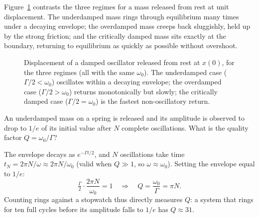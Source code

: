 Figure~\ref{fig:damped-decay} contrasts the three regimes for a mass released from rest at unit displacement. The underdamped mass rings through equilibrium many times under a decaying envelope; the overdamped mass creeps back sluggishly, held up by the strong friction; and the critically damped mass sits exactly at the boundary, returning to equilibrium as quickly as possible without overshoot.

\begin{figure}[ht]
\centering
{}
\caption{Displacement of a damped oscillator released from rest at $x(0)$, for the three regimes (all with the same $\omega_0$). The underdamped case ($\Gamma/2 < \omega_0$) oscillates within a decaying envelope; the overdamped case ($\Gamma/2 > \omega_0$) returns monotonically but slowly; the critically damped case ($\Gamma/2 = \omega_0$) is the fastest non-oscillatory return.}
\label{fig:damped-decay}
\end{figure}

\begin{example}
An underdamped mass on a spring is released and its amplitude is observed to drop to $1/e$ of its initial value after $N$ complete oscillations. What is the quality factor $Q = \omega_0/\Gamma$?

The envelope decays as $e^{-\Gamma t/2}$, and $N$ oscillations take time $t_N = 2\pi N/\omega \approx 2\pi N/\omega_0$ (valid when $Q \gg 1$, so $\omega \approx \omega_0$). Setting the envelope equal to $1/e$:
\begin{equation}
    \tfrac{\Gamma}{2}\cdot\frac{2\pi N}{\omega_0} = 1
    \quad\Longrightarrow\quad
    Q = \frac{\omega_0}{\Gamma} = \pi N.
\end{equation}
Counting rings against a stopwatch thus directly measures $Q$: a system that rings for ten full cycles before its amplitude falls to $1/e$ has $Q \approx 31$.
\end{example}

